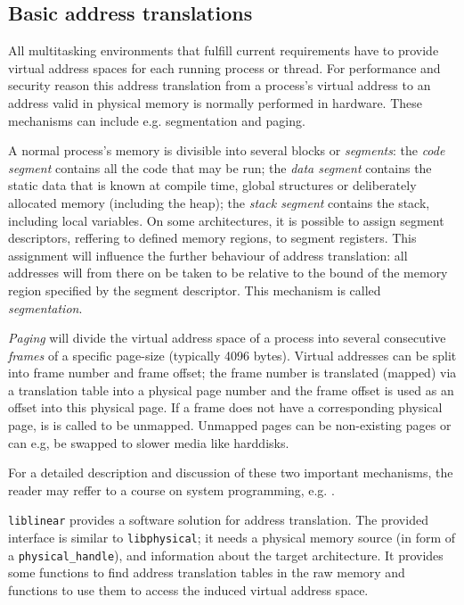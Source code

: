 \subsection{Basic address translations}

\label{address_translation} All multitasking environments that fulfill current
requirements have to provide virtual address spaces for each running process or
thread. For performance and security reason this address translation from a
process's virtual address to an address valid in physical memory is normally
performed in hardware.  These mechanisms can include e.g. segmentation and
paging.

A normal process's memory is divisible into several blocks or \emph{segments}:
the \emph{code segment} contains all the code that may be run; the \emph{data
segment} contains the static data that is known at compile time, global
structures or deliberately allocated memory (including the heap); the
\emph{stack segment} contains the stack, including local variables.  On some
architectures, it is possible to assign segment descriptors, reffering to
defined memory regions, to segment registers.  This assignment will influence
the further behaviour of address translation: all addresses will from there on
be taken to be relative to the bound of the memory region specified by the
segment descriptor. This mechanism is called \emph{segmentation}.

\emph{Paging} will divide the virtual address space of a process into several
consecutive \emph{frames} of a specific page-size (typically 4096 bytes).
Virtual addresses can be split into frame number and frame offset; the frame
number is translated (mapped) via a translation table into a physical page
number and the frame offset is used as an offset into this physical page. If a
frame does not have a corresponding physical page, is is called to be unmapped.
Unmapped pages can be non-existing pages or can e.g, be swapped to slower media
like harddisks.

For a detailed description and discussion of these two important mechanisms, the
reader may reffer to a course on system programming, e.g.
\cite{rwth_syspro_scriptum:2002}.

\texttt{liblinear} provides a software solution for address translation. The
provided interface is similar to \texttt{libphysical}; it needs a physical
memory source (in form of a \texttt{physical\_handle}), and information about
the target architecture. It provides some functions to find address translation
tables in the raw memory and functions to use them to access the induced virtual
address space.



